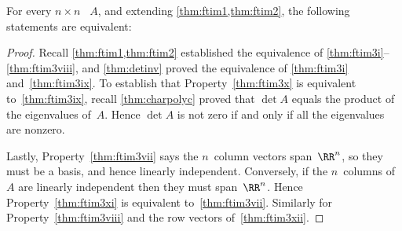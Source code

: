 \begin{theorem} \label{thm:ftim3} 
For every \(n\times n\) ~\(A\), and  
extending \cref{thm:ftim1,thm:ftim2}, the following statements are equivalent:
\end{theorem}
\begin{proof} 
Recall \cref{thm:ftim1,thm:ftim2} established the equivalence of \ref{thm:ftim3i}--\ref{thm:ftim3viii}, and \cref{thm:detinv} proved the equivalence of \ref{thm:ftim3i} and~\ref{thm:ftim3ix}.
To establish that Property~\ref{thm:ftim3x} is equivalent to~\ref{thm:ftim3ix}, recall \cref{thm:charpolyc} proved that \(\det A\) equals the product of the eigenvalues of~\(A\). 
Hence  \(\det A\) is not zero if and only if all the eigenvalues are nonzero.  

Lastly, Property~\ref{thm:ftim3vii} says the \(n\)~column vectors span~\(\RR^n\), so they must be a basis, and hence linearly independent.
Conversely, if the \(n\)~columns of~\(A\) are linearly independent then they must span~\(\RR^n\).  
Hence Property~\ref{thm:ftim3xi} is equivalent to~\ref{thm:ftim3vii}.
Similarly  for Property~\ref{thm:ftim3viii} and the row vectors of~\ref{thm:ftim3xii}.
\end{proof}


